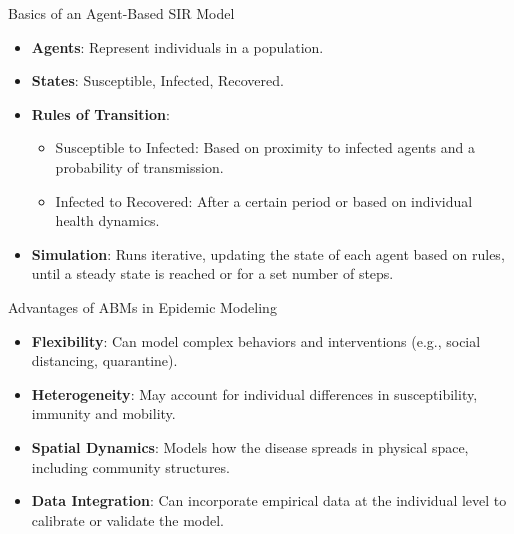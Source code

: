 \begin{frame}{Basics of an Agent-Based SIR Model}
\begin{itemize}
    \item \textbf{Agents}: Represent individuals in a population.
    \item \textbf{States}: Susceptible, Infected, Recovered.
    \pause
    \item \textbf{Rules of Transition}:
    \begin{itemize}
        \item Susceptible to Infected: Based on proximity to infected agents and a probability of transmission.
        \item Infected to Recovered: After a certain period or based on individual health dynamics.
    \end{itemize}
        \pause
    \item \textbf{Simulation}: Runs iterative, updating the state of each agent based on rules, until a steady state is reached or for a set number of steps.
\end{itemize}
\end{frame}


\begin{frame}{Advantages of ABMs in Epidemic Modeling}
\begin{itemize}
    \item \textbf{Flexibility}: Can model complex behaviors and interventions (e.g., social distancing, quarantine).
        \pause
    \item \textbf{Heterogeneity}: May account for individual differences in susceptibility, immunity and mobility.
        \pause
    \item \textbf{Spatial Dynamics}: Models how the disease spreads in physical space, including community structures.
        \pause
    \item \textbf{Data Integration}: Can incorporate empirical data at the individual level to calibrate or validate the model.
\end{itemize}



\end{frame}


